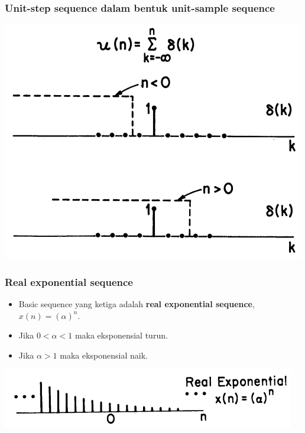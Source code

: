 \documentclass[pdflatex,compress]{beamer}
\begin{document}
\begin{frame}
	\frametitle{Unit-step sequence dalam bentuk unit-sample sequence}
	\begin{center}
		\includegraphics[height=0.8\textheight]{img/img008}
	\end{center}
\end{frame}

\begin{frame}
	\frametitle{Real exponential sequence}
	\begin{itemize}
		\item Basic sequence yang ketiga adalah \textbf{real exponential sequence}, $ x(n) = (\alpha)^n $.
		\item Jika $ 0 < \alpha < 1 $ maka eksponensial turun.
		\item Jika $ \alpha > 1 $ maka eksponensial naik.
	\end{itemize}
	\begin{center}
		\includegraphics[width=0.8\linewidth]{img/img009}
	\end{center}
\end{frame}
\end{document}
